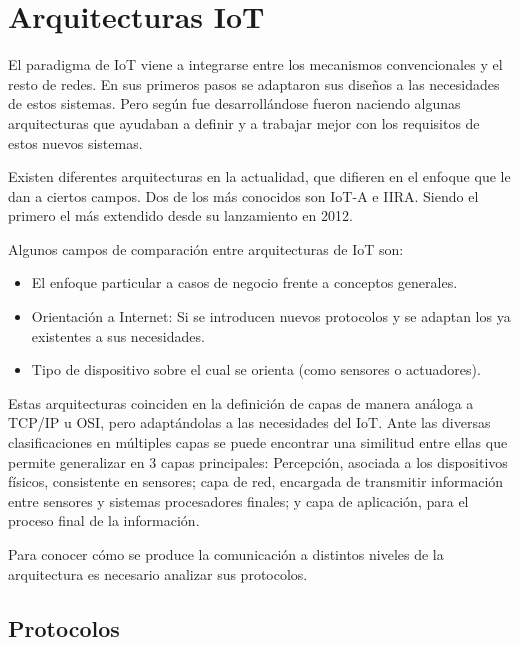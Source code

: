 \documentclass[a4paper,10pt]{article}
\begin{document}
\newpage

\section{Arquitecturas IoT}\label{arquitecturas-iot}

El paradigma de IoT viene a integrarse entre los mecanismos
convencionales y el resto de redes. En sus primeros pasos se adaptaron
sus diseños a las necesidades de estos sistemas. Pero según fue
desarrollándose fueron naciendo algunas arquitecturas que ayudaban a
definir y a trabajar mejor con los requisitos de estos nuevos sistemas.

Existen diferentes arquitecturas en la actualidad, que difieren en el
enfoque que le dan a ciertos campos. Dos de los más conocidos son IoT-A
e IIRA. Siendo el primero el más extendido desde su lanzamiento en
2012.\cite{weyrichReferenceArchitecturesInternet2016}

Algunos campos de comparación entre arquitecturas de IoT son\cite{atzoriInternetThingsSurvey2010}:

\begin{itemize}
\item
  El enfoque particular a casos de negocio frente a conceptos generales.
\item
  Orientación a Internet: Si se introducen nuevos protocolos y se
  adaptan los ya existentes a sus necesidades.
\item
  Tipo de dispositivo sobre el cual se orienta (como sensores o
  actuadores).
\end{itemize}

Estas arquitecturas coinciden en la definición de capas de manera
análoga a TCP/IP u
OSI\cite{weyrichReferenceArchitecturesInternet2016}, pero adaptándolas
a las necesidades del IoT. Ante las diversas clasificaciones en
múltiples capas se puede encontrar una similitud entre ellas que
permite generalizar en 3 capas principales: Percepción, asociada a los
dispositivos físicos, consistente en sensores; capa de red, encargada
de transmitir información entre sensores y sistemas procesadores
finales; y capa de aplicación, para el proceso final de la
información\cite{khanFutureInternetInternet2012}.

Para conocer cómo se produce la comunicación a distintos niveles de la
arquitectura es necesario analizar sus protocolos.

\subsection{Protocolos}\label{subsec:protocolos}
\end{document}
